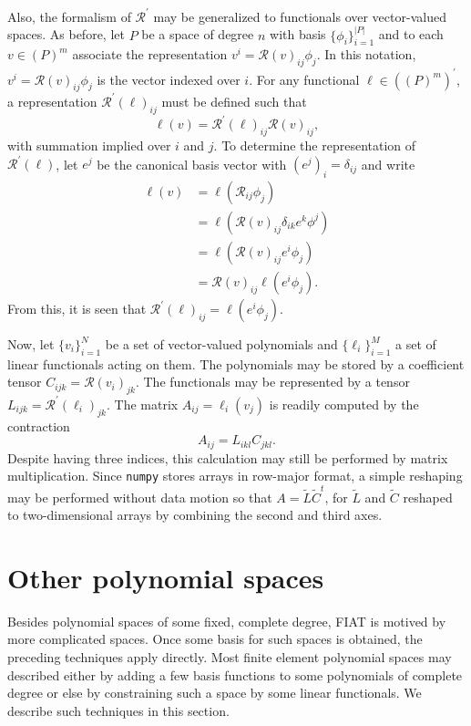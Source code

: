 Also, the formalism of \( \mathcal{R}^\prime \) may be generalized to
functionals over vector-valued spaces.  As before, let \( P \) be a
space of degree \( n \) with basis \( \{ \phi_i \}_{i=1}^{|P|} \) and
to each \( v \in (P)^m \) associate the representation \( v^i
= \mathcal{R}(v)_{ij}\phi_j \).  In this notation,
\( v^i = \mathcal{R}(v)_{ij} \phi_j \) is the vector indexed over \( i \).
For any functional
\( \ell \in \left( \left(P\right)^m \right)^\prime \), a
representation \( \mathcal{R}^\prime(\ell)_{ij} \) must be defined
such that
\[
\ell(v) = \mathcal{R}^\prime(\ell)_{ij} \mathcal{R}(v)_{ij},
\]
with summation implied over \(i\) and \( j\).  To determine the
representation of \( \mathcal{R}^\prime(\ell) \), let \( e^j \) be the
canonical basis vector with \( (e^j)_i = \delta_{ij} \) and
write
\begin{equation}
\begin{split}
\ell(v) & = \ell( \mathcal{R}_{ij}\phi_j ) \\
& = \ell( \mathcal{R}(v)_{ij} \delta_{ik} e^k \phi^j ) \\
& = \ell( \mathcal{R}(v)_{ij} e^i \phi_j ) \\
& = \mathcal{R}(v)_{ij} \ell( e^i \phi_j ).
\end{split}
\end{equation}
From this, it is seen that \( \mathcal{R}^\prime(\ell)_{ij} = \ell(
e^i \phi_j ) \).

Now, let \( \{ v_i \}_{i=1}^N \) be a set of vector-valued polynomials
and \( \{ \ell_i \}_{i=1}^M \) a set of linear functionals acting on
them.  The polynomials may be stored by a coefficient tensor \(
C_{ijk} = \mathcal{R}(v_i)_{jk} \).  The functionals may be
represented by a tensor \( L_{ijk} = \mathcal{R}^\prime(\ell_i)_{jk}
\).  The matrix \( A_{ij} = \ell_i(v_j) \) is readily computed by the
contraction
\[
A_{ij} = L_{ikl} C_{jkl}.
\]
Despite having three indices, this calculation may still be performed by
matrix multiplication.  Since \texttt{numpy} stores arrays in row-major
format, a simple reshaping may be performed without data motion
so that \( A = \tilde{L} \tilde{C}^t \), for \( \tilde{L} \) and \(
\tilde{C} \) reshaped to two-dimensional arrays by combining the
second and third axes.



\section{Other polynomial spaces}
Besides polynomial spaces of some fixed, complete degree, FIAT 
is motived by more complicated spaces.  Once some basis for such
spaces is obtained, the preceding techniques apply directly.  
Most finite element polynomial spaces may described either by adding a few
basis functions to some polynomials of complete degree or else by
constraining such a space by some linear functionals.  We describe
such techniques in this section.

